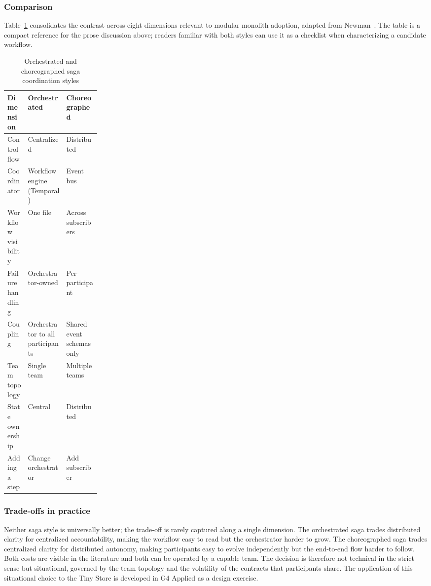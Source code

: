 \subsubsection*{Comparison}

Table~\ref{tab:saga-styles} consolidates the contrast across eight dimensions relevant to modular monolith adoption, adapted from Newman~\cite{newman2019monolith}. The table is a compact reference for the prose discussion above; readers familiar with both styles can use it as a checklist when characterizing a candidate workflow.

\begin{table}[H]
  \centering
  \small
  \caption{Orchestrated and choreographed saga coordination styles}
  \label{tab:saga-styles}
  \begin{tabularx}{\linewidth}{p{0.22\linewidth} X X}
    \toprule
    \textbf{Dimension} & \textbf{Orchestrated} & \textbf{Choreographed} \\
    \midrule
    Control flow & Centralized & Distributed \\
    Coordinator & Workflow engine (Temporal) & Event bus \\
    Workflow visibility & One file & Across subscribers \\
    Failure handling & Orchestrator-owned & Per-participant \\
    Coupling & Orchestrator to all participants & Shared event schemas only \\
    Team topology & Single team & Multiple teams \\
    State ownership & Central & Distributed \\
    Adding a step & Change orchestrator & Add subscriber \\
    \bottomrule
  \end{tabularx}
\end{table}

\subsubsection*{Trade-offs in practice}

Neither saga style is universally better; the trade-off is rarely captured along a single dimension. The orchestrated saga trades distributed clarity for centralized accountability, making the workflow easy to read but the orchestrator harder to grow. The choreographed saga trades centralized clarity for distributed autonomy, making participants easy to evolve independently but the end-to-end flow harder to follow. Both costs are visible in the literature and both can be operated by a capable team. The decision is therefore not technical in the strict sense but situational, governed by the team topology and the volatility of the contracts that participants share. The application of this situational choice to the Tiny Store is developed in G4 Applied as a design exercise.

